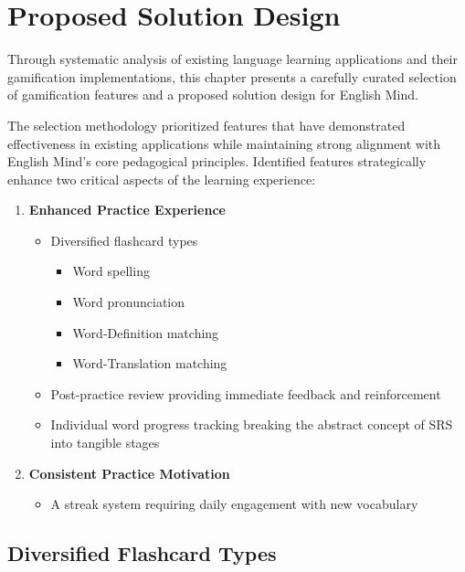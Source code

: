 \chapter{Proposed Solution Design}
\label{chap:proposed-solution-design}

Through systematic analysis of existing language learning applications and their gamification implementations, this chapter presents a carefully curated selection of gamification features and a proposed solution design for English Mind. 

The selection methodology prioritized features that have demonstrated effectiveness in existing applications while maintaining strong alignment with English Mind's core pedagogical principles. Identified features strategically enhance two critical aspects of the learning experience:

\begin{enumerate}
    \item \textbf{Enhanced Practice Experience} 
    \begin{itemize}
        \item Diversified flashcard types
        \begin{itemize}
            \item Word spelling
            \item Word pronunciation
            \item Word-Definition matching
            \item Word-Translation matching
        \end{itemize}
        \item Post-practice review providing immediate feedback and reinforcement
        \item Individual word progress tracking breaking the abstract concept of SRS into tangible stages
    \end{itemize}
    
    \item \textbf{Consistent Practice Motivation} 
    \begin{itemize}
        \item A streak system requiring daily engagement with new vocabulary
    \end{itemize}
\end{enumerate}

\newpage
\section{Diversified Flashcard Types}

